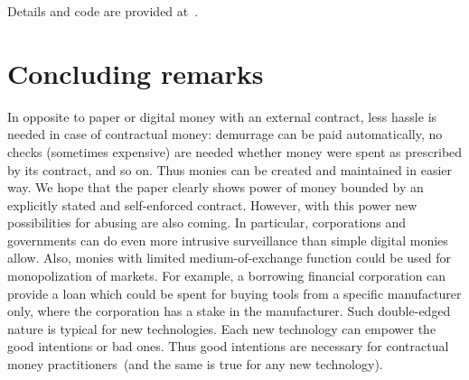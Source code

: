 \documentclass[]{llncs}   %
\newcommand{\authnote}[2]{\marginpar{\parbox{\marginparwidth}{\tiny %
  \textsf{#1 {\textcolor{blue}{notes: #2}}}}}%
  \textcolor{blue}{\textbf{\dag}}}
\newcommand{\authnote}[2]{
  \textsf{#1\textcolor{blue}{ #2}}}
\newcommand{\authnote}[2]{}
\newcommand{\knote}[1]{{\authnote{\textcolor{green}{Alex notes:}}{#1}}}
\begin{document}
\knote{Amitabh, please complete this section}


Details and code are provided at~\cite{lets-trustless}.


\section{Concluding remarks}
\label{sec-conslusion}

In opposite to paper or digital money with an external contract, less hassle is needed in case of contractual money: demurrage can be paid automatically, no checks (sometimes expensive) are needed whether money were spent as prescribed
by its contract, and so on. Thus monies can be created and maintained in easier way. We hope that the paper clearly shows power of money bounded by an explicitly stated and self-enforced contract. However, with this power new possibilities for abusing are also coming. In particular, corporations and governments can do even more intrusive surveillance than simple digital monies allow.  Also, monies with limited medium-of-exchange function could be used for monopolization of markets. For example, a borrowing financial corporation can provide a loan which could be spent for buying tools from a specific manufacturer only, where the corporation has a stake in the manufacturer. Such double-edged nature is typical for new technologies. Each new technology can empower the good intentions or bad ones. Thus good intentions are necessary for contractual money practitioners~(and the same is true for any new technology).



\end{document}
